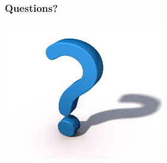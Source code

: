 \documentclass{beamer}
\begin{document}
\begin{frame}
\frametitle{Questions?} 
\begin{center}
  	\includegraphics[width=7cm]{questions.jpg}
\end{center}
\end{frame}
\end{document}
